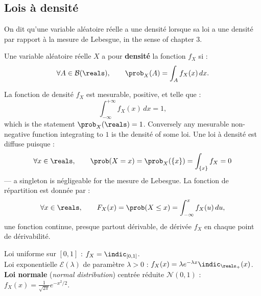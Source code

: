 \subsection{Lois à densité}

On dit qu'une variable aléatoire réelle a une densité lorsque sa loi a une densité
par rapport à la mesure de Lebesgue, in the sense of chapter 3.

\begin{definition}
  Une variable aléatoire réelle $X$ a pour \textbf{densité} la fonction $f_{X}$ si :
  \[
    \forall A \in \mathcal{B}(\reals), \qquad
    \prob_{X}(A) = \int_{A} f_{X}(x)\,dx .
  \]
\end{definition}

La fonction de densité $f_{X}$ est mesurable, positive, et telle que :
\[
  \int_{-\infty}^{+\infty} f_{X}(x)\,dx = 1 ,
\]
which is the statement $\prob_{X}(\reals)=1$. Conversely any mesurable
non-negative function integrating to $1$ is the densité of some loi. Une loi à
densité est diffuse puisque :
\[
  \forall x \in \reals, \qquad \prob(X=x) = \prob_{X}(\{x\}) = \int_{\{x\}} f_{X} = 0
\]
--- a singleton is négligeable for the mesure de Lebesgue. La fonction de
répartition est donnée par :
\[
  \forall x \in \reals, \qquad F_{X}(x) = \prob(X \leq x) = \int_{-\infty}^{x} f_{X}(u)\,du ,
\]
une fonction continue, presque partout dérivable, de dérivée $f_{X}$ en chaque
point de dérivabilité.

\begin{example}
  Loi uniforme sur $[0,1]$ : $f_{X} = \indic_{[0,1]}$. \\
  Loi exponentielle $\mathcal{E}(\lambda)$ de paramètre $\lambda > 0$ :
  $f_{X}(x) = \lambda e^{-\lambda x} \indic_{\reals_{+}}(x)$. \\
  \textbf{Loi normale} (\textit{normal distribution}) centrée réduite
  $\mathcal{N}(0,1)$ :
  $f_{X}(x) = \frac{1}{\sqrt{2\pi}} e^{-x^{2}/2}$.
\end{example}

